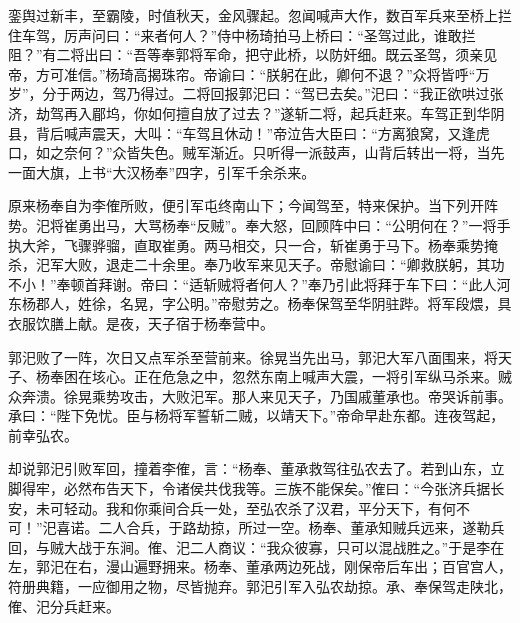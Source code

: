 銮舆过新丰，至霸陵，时值秋天，金风骤起。忽闻喊声大作，数百军兵来至桥上拦住车驾，厉声问曰：“来者何人？”侍中杨琦拍马上桥曰：“圣驾过此，谁敢拦阻？”有二将出曰：“吾等奉郭将军命，把守此桥，以防奸细。既云圣驾，须亲见帝，方可准信。”杨琦高揭珠帘。帝谕曰：“朕躬在此，卿何不退？”众将皆呼“万岁”，分于两边，驾乃得过。二将回报郭汜曰：“驾已去矣。”汜曰：“我正欲哄过张济，劫驾再入郿坞，你如何擅自放了过去？”遂斩二将，起兵赶来。车驾正到华阴县，背后喊声震天，大叫：“车驾且休动！”帝泣告大臣曰：“方离狼窝，又逢虎口，如之奈何？”众皆失色。贼军渐近。只听得一派鼓声，山背后转出一将，当先一面大旗，上书“大汉杨奉”四字，引军千余杀来。

原来杨奉自为李傕所败，便引军屯终南山下；今闻驾至，特来保护。当下列开阵势。汜将崔勇出马，大骂杨奉“反贼”。奉大怒，回顾阵中曰：“公明何在？”一将手执大斧，飞骤骅骝，直取崔勇。两马相交，只一合，斩崔勇于马下。杨奉乘势掩杀，汜军大败，退走二十余里。奉乃收军来见天子。帝慰谕曰：“卿救朕躬，其功不小！”奉顿首拜谢。帝曰：“适斩贼将者何人？”奉乃引此将拜于车下曰：“此人河东杨郡人，姓徐，名晃，字公明。”帝慰劳之。杨奉保驾至华阴驻跸。将军段煨，具衣服饮膳上献。是夜，天子宿于杨奉营中。

郭汜败了一阵，次日又点军杀至营前来。徐晃当先出马，郭汜大军八面围来，将天子、杨奉困在垓心。正在危急之中，忽然东南上喊声大震，一将引军纵马杀来。贼众奔溃。徐晃乘势攻击，大败汜军。那人来见天子，乃国戚董承也。帝哭诉前事。承曰：“陛下免忧。臣与杨将军誓斩二贼，以靖天下。”帝命早赴东都。连夜驾起，前幸弘农。

却说郭汜引败军回，撞着李傕，言：“杨奉、董承救驾往弘农去了。若到山东，立脚得牢，必然布告天下，令诸侯共伐我等。三族不能保矣。”傕曰：“今张济兵据长安，未可轻动。我和你乘间合兵一处，至弘农杀了汉君，平分天下，有何不可！”汜喜诺。二人合兵，于路劫掠，所过一空。杨奉、董承知贼兵远来，遂勒兵回，与贼大战于东涧。傕、汜二人商议：“我众彼寡，只可以混战胜之。”于是李在左，郭汜在右，漫山遍野拥来。杨奉、董承两边死战，刚保帝后车出；百官宫人，符册典籍，一应御用之物，尽皆抛弃。郭汜引军入弘农劫掠。承、奉保驾走陕北，傕、汜分兵赶来。

